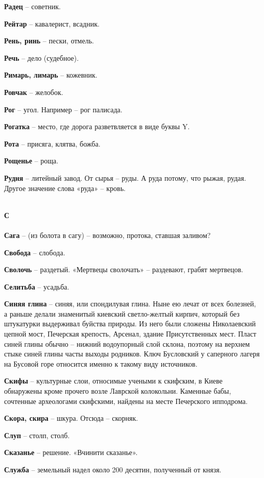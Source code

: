 \begin{multicols}{2}
\textbf{Радец} – советник.

\textbf{Рейтар} – кавалерист, всадник.

\textbf{Рень, ринь} – пески, отмель.

\textbf{Речь} – дело (судебное).

\textbf{Римарь, лимарь} – кожевник.

\textbf{Ровчак} – желобок.

\textbf{Рог} – угол. Например – рог палисада.

\textbf{Рогатка} – место, где дорога разветвляется в виде буквы Y. 

\textbf{Рота} – присяга, клятва, божба.

\textbf{Рощенье} – роща.

\textbf{Рудня} – литейный завод. От сырья – руды. А руда потому, что рыжая, рудая. Другое значение слова «руда» – кровь.

\mbox{ }\\
\textbf{С\\}
\mbox{ }\\

\textbf{Сага} – (из болота в сагу) – возможно, протока, ставшая заливом?

\textbf{Свобода} – слобода.

\textbf{Сволочь} – раздетый. «Мертвецы сволочать» – раздевают, грабят мертвецов.

\textbf{Селитьба} – усадьба.

\textbf{Синяя глина} – синяя, или спондилувая глина. Ныне ею лечат от всех болезней, а раньше делали знаменитый киевский светло-желтый кирпич, который без штукатурки выдерживал буйства природы. Из него были сложены Николаевский цепной мост, Печерская крепость, Арсенал, здание Присутственных мест. Пласт синей глины обычно – нижний водоупорный слой склона, поэтому на верхнем стыке синей глины часты выходы родников. Ключ Бусловский у саперного лагеря на Бусовой горе относится именно к такому виду источников. 

\textbf{Скифы} – культурные слои, относимые учеными к скифским, в Киеве обнаружены кроме прочего возле Лаврской колокольни. Каменные бабы, сочтенные археологами скифскими, найдены на месте Печерского ипподрома.

\textbf{Скора, скира} – шкура. Отсюда – скорняк.

\textbf{Слуп} – столп, столб.

\textbf{Сказанье} – решение. «Вчинити сказанье».

\textbf{Служба} – земельный надел около 200 десятин, полученный от князя.


\end{multicols}
